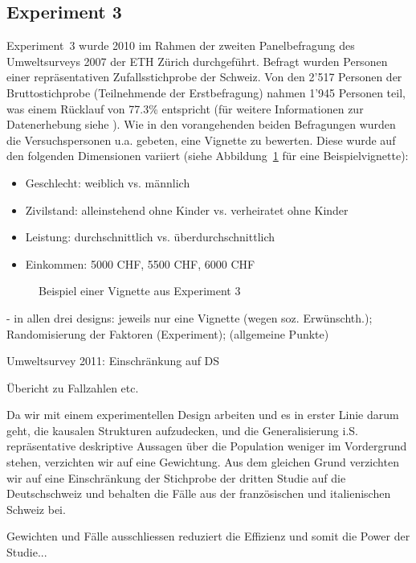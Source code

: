 \documentclass[a4paper,12pt]{article}
\renewcommand{\baselinestretch}{1.1}
\newif\ifcomments
\newcommand{\comment}[1]{%
    \ifcomments\marginpar{\renewcommand{\baselinestretch}{1}\tiny\hspace*{-1.1em}\colorbox{gray!20}%
    {\textcolor{red}{\parbox[t]{.9in}{\raggedright #1}}}}\fi}
\begin{document}
\subsection{Experiment 3}
Experiment~3 wurde 2010 im Rahmen der zweiten Panelbefragung des Umweltsurveys
2007 der ETH Zürich durchgeführt. Befragt wurden Personen einer repräsentativen
Zufallsstichprobe der Schweiz. Von den 2'517 Personen der Bruttostichprobe
(Teilnehmende der Erstbefragung) nahmen 1'945 Personen teil, was einem Rücklauf
von 77.3\% entspricht (für weitere Informationen zur Datenerhebung siehe
\citealp{Diekmann-etal-2012}). Wie in den vorangehenden beiden Befragungen
wurden die Versuchspersonen u.a. gebeten, eine Vignette zu bewerten. Diese wurde
auf den folgenden Dimensionen variiert (siehe Abbildung~\ref{fig-3} für eine Beispielvignette):
\comment{Tabelle zu Faktoren wie bei Experiment 1}
\begin{itemize}
\item Geschlecht: weiblich vs. männlich
\item Zivilstand: alleinstehend ohne Kinder vs. verheiratet ohne Kinder
\item Leistung: durchschnittlich vs. überdurchschnittlich
\item Einkommen: 5000 CHF, 5500 CHF, 6000 CHF
\end{itemize}

\begin{figure}\centering
    \caption{Beispiel einer Vignette aus Experiment 3}\label{fig-3}
\end{figure}

- in allen drei designs: jeweils nur eine Vignette (wegen soz. Erwünschth.); Randomisierung der Faktoren (Experiment); (allgemeine Punkte)

Umweltsurvey 2011: Einschränkung auf DS

Übericht zu Fallzahlen etc.

Da wir mit einem experimentellen Design arbeiten und es in erster Linie darum geht,
die kausalen Strukturen aufzudecken, und die Generalisierung i.S. 
repräsentative deskriptive Aussagen über die Population weniger im Vordergrund stehen, verzichten wir auf eine Gewichtung.
Aus dem gleichen Grund verzichten wir auf eine Einschränkung der Stichprobe der dritten Studie auf die Deutschschweiz und 
behalten die Fälle aus der französischen und italienischen Schweiz bei.

Gewichten und Fälle ausschliessen reduziert die Effizienz und somit die Power der Studie...
\end{document}
